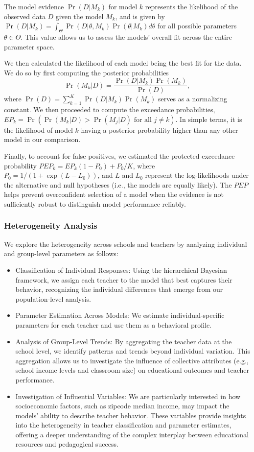 \documentclass[
  number,
  preprint,
  3p,
  onecolumn]{elsarticle}
\begin{document}
The model evidence \(\Pr(D | M_k)\) for model \(k\) represents the
likelihood of the observed data \(D\) given the model \(M_k\), and is
given by
\(\Pr(D|M_k) = \int_{\Theta} \Pr(D|\theta, M_k) \Pr(\theta|M_k) d\theta\)
for all possible parameters \(\theta \in \Theta\). This value allows us
to assess the models' overall fit across the entire parameter space.

We then calculated the likelihood of each model being the best fit for
the data. We do so by first computing the posterior probabilities \[
\Pr(M_k|D) = \frac{\Pr(D|M_k)\Pr(M_k)}{\Pr(D)},
\] where \(\Pr(D) = \sum_{k=1}^K \Pr(D|M_k)\Pr(M_k)\) serves as a
normalizing constant. We then proceeded to compute the exceedance
probabilities,
\(EP_k = \Pr(\Pr(M_k|D) > \Pr(M_j|D) \text{ for all } j \neq k)\). In
simple terms, it is the likelihood of model \(k\) having a posterior
probability higher than any other model in our comparison.

Finally, to account for false positives, we estimated the protected
exceedance probability \(PEP_k = EP_k(1 - P_0) + P_0/K\), where
\(P_0 = 1/(1 + \exp(L - L_0))\), and \(L\) and \(L_0\) represent the
log-likelihoods under the alternative and null hypotheses (i.e., the
models are equally likely). The \(PEP\) helps prevent overconfident
selection of a model when the evidence is not sufficiently robust to
distinguish model performance reliably.

\subsubsection{Heterogeneity Analysis}\label{heterogeneity-analysis}

We explore the heterogeneity across schools and teachers by analyzing
individual and group-level parameters as follows:

\begin{itemize}
\item
  Classification of Individual Responses: Using the hierarchical
  Bayesian framework, we assign each teacher to the model that best
  captures their behavior, recognizing the individual differences that
  emerge from our population-level analysis.
\item
  Parameter Estimation Across Models: We estimate individual-specific
  parameters for each teacher and use them as a behavioral profile.
\item
  Analysis of Group-Level Trends: By aggregating the teacher data at the
  school level, we identify patterns and trends beyond individual
  variation. This aggregation allows us to investigate the influence of
  collective attributes (e.g., school income levels and classroom size)
  on educational outcomes and teacher performance.
\item
  Investigation of Influential Variables: We are particularly interested
  in how socioeconomic factors, such as zipcode median income, may
  impact the models' ability to describe teacher behavior. These
  variables provide insights into the heterogeneity in teacher
  classification and parameter estimates, offering a deeper
  understanding of the complex interplay between educational resources
  and pedagogical success.
\end{itemize}
\end{document}
